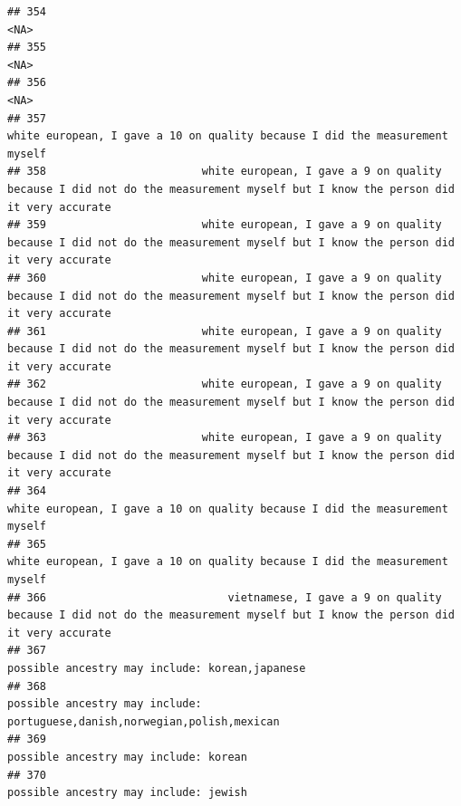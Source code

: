 \documentclass[]{article}
\begin{document}
\begin{verbatim}
## 354                                                                                                                                                <NA>
## 355                                                                                                                                                <NA>
## 356                                                                                                                                                <NA>
## 357                                                                         white european, I gave a 10 on quality because I did the measurement myself
## 358                        white european, I gave a 9 on quality because I did not do the measurement myself but I know the person did it very accurate
## 359                        white european, I gave a 9 on quality because I did not do the measurement myself but I know the person did it very accurate
## 360                        white european, I gave a 9 on quality because I did not do the measurement myself but I know the person did it very accurate
## 361                        white european, I gave a 9 on quality because I did not do the measurement myself but I know the person did it very accurate
## 362                        white european, I gave a 9 on quality because I did not do the measurement myself but I know the person did it very accurate
## 363                        white european, I gave a 9 on quality because I did not do the measurement myself but I know the person did it very accurate
## 364                                                                         white european, I gave a 10 on quality because I did the measurement myself
## 365                                                                         white european, I gave a 10 on quality because I did the measurement myself
## 366                            vietnamese, I gave a 9 on quality because I did not do the measurement myself but I know the person did it very accurate
## 367                                                                                                      possible ancestry may include: korean,japanese
## 368                                                                           possible ancestry may include: portuguese,danish,norwegian,polish,mexican
## 369                                                                                                               possible ancestry may include: korean
## 370                                                                                                               possible ancestry may include: jewish

\end{verbatim}
\end{document}
